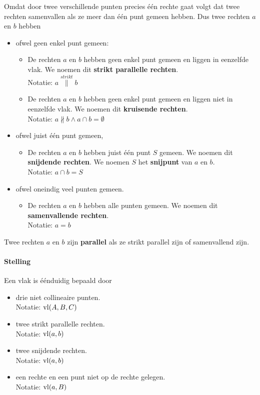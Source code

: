 \documentclass[12pt,twoside]{article}
\begin{document}
Omdat door twee verschillende punten precies één rechte gaat volgt dat twee rechten samenvallen als ze meer dan één punt gemeen hebben. Dus twee rechten $a$ en $b$ hebben
\begin{itemize}
  \item ofwel geen enkel punt gemeen:
  \begin{itemize}
    \item De rechten $a$ en $b$ hebben geen enkel punt gemeen en liggen in eenzelfde vlak. We noemen dit {\bf strikt parallelle rechten}.\\
    Notatie: $a \overset{strikt}{\parallel} b$
    \item De rechten $a$ en $b$ hebben geen enkel punt gemeen en liggen niet in eenzelfde vlak. We noemen dit {\bf kruisende rechten}.\\
    Notatie: $a\nparallel b \wedge  a \cap b = \emptyset$
  \end{itemize}
  \item ofwel juist één punt gemeen,
  \begin{itemize}
    \item De rechten $a$ en $b$ hebben juist één punt $S$ gemeen. We noemen dit {\bf snijdende rechten}. We noemen $S$ het {\bf snijpunt} van $a$ en $b$.\\
    Notatie: $a \cap b = S$
  \end{itemize}
  \item ofwel oneindig veel punten gemeen.
  \begin{itemize}
    \item De rechten $a$ en $b$ hebben alle punten gemeen. We noemen dit {\bf samenvallende rechten}.\\
    Notatie: $a = b$
  \end{itemize}
\end{itemize}

Twee rechten $a$ en $b$ zijn {\bf parallel} als ze strikt parallel zijn of samenvallend zijn.\\

\paragraph*{Stelling}
Een vlak is éénduidig bepaald door
\begin{itemize}
  \item drie niet collineaire punten.\\
  Notatie: $\vl(A,B,C)$
  \item twee strikt parallelle rechten.\\
  Notatie: $\vl(a,b)$
  \item twee snijdende rechten.\\
  Notatie: $\vl(a,b)$
  \item een rechte en een punt niet op de rechte gelegen.\\
  Notatie: $\vl(a,B)$
\end{itemize}
\end{document}
